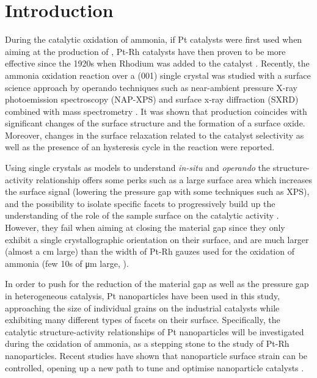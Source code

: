 \section{Introduction}

During the catalytic oxidation of ammonia, if Pt catalysts were first used when aiming at the production of , Pt-Rh catalysts have then proven to be more effective since the 1920s when Rhodium was added to the catalyst \parencite{Handforth1934, Heck1982}.
Recently, the ammonia oxidation reaction over a (001) single crystal was studied with a surface science approach by operando techniques such as near-ambient pressure X-ray photoemission spectroscopy (NAP-XPS) and surface x-ray diffraction (SXRD) combined with mass spectrometry \parencite{Resta2020a}.
It was shown that  production coincides with significant changes of the surface structure and the formation of a  surface oxide.
Moreover, changes in the surface relaxation related to the catalyst selectivity as well as the presence of an hysteresis cycle in the reaction were reported.

Using single crystals as models to understand \textit{in-situ} and \textit{operando} the structure-activity relationship offers some perks such as a large surface area which increases the surface signal (lowering the pressure gap with some techniques such as XPS), and the possibility to isolate specific facets to progressively build up the understanding of the role of the sample surface on the catalytic activity \parencite{Hejral2016, Resta2020a}.
However, they fail when aiming at closing the material gap since they only exhibit a single crystallographic orientation on their surface, and are much larger (almost a \unit{cm} large) than the width of Pt-Rh gauzes used for the oxidation of ammonia (few 10s of \unit{\micro\meter} large, \cite{Kaiser1909}).

In order to push for the reduction of the material gap as well as the pressure gap in heterogeneous catalysis, Pt nanoparticles have been used in this study, approaching the size of individual grains on the industrial catalysts \cite{} while exhibiting many different types of facets on their surface.
Specifically, the catalytic structure-activity relationships of Pt nanoparticles will be investigated during the oxidation of ammonia, as a stepping stone to the study of Pt-Rh nanoparticles.
Recent studies have shown that nanoparticle surface strain can be controlled, opening up a new path to tune and optimise nanoparticle catalysts \parencite{Zhang2014, Sneed2015, Wang2016}.

